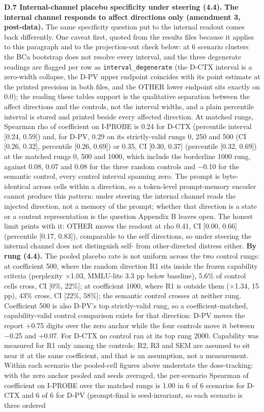 \documentclass[11pt,a4paper]{article}
\newcommand{\pnum}[2]{#2}
\begin{document}
\textbf{D.7 Internal-channel placebo specificity under steering (4.4).} \textbf{The internal channel responds to affect directions only (amendment 3, post-data).} The same specificity question put to the internal readout comes back differently. One caveat first, quoted from the results files because it applies to this paragraph and to the projection-out check below: at 6 scenario clusters the BCa bootstrap does not resolve every interval, and the three degenerate readings are flagged per row as \texttt{interval\_degenerate} (the D-CTX interval is a zero-width collapse, the D-PV upper endpoint coincides with its point estimate at the printed precision in both files, and the OTHER lower endpoint sits exactly on 0.0); the reading these tables support is the qualitative separation between the affect directions and the controls, not the interval widths, and a plain percentile interval is stored and printed beside every affected direction. At matched rungs, Spearman rho of coefficient on I-PROBE is \pnum{panelAp\_internal\_specificity}{0.24} for D-CTX (percentile interval [0.24, 0.59]) and, for D-PV, 0.29 on its strictly-valid rungs 0, 250 and 500 (CI [0.26, 0.32], percentile [0.26, 0.69]) or 0.35, CI [0.30, 0.37] (percentile [0.32, 0.69]) at the matched rungs 0, 500 and 1000, which include the borderline 1000 rung, against 0.08, 0.07 and 0.08 for the three random controls and $-$0.10 for the semantic control, every control interval spanning zero. The prompt is byte-identical across cells within a direction, so a token-level prompt-memory encoder cannot produce this pattern: under steering the internal channel reads the injected direction, not a memory of the prompt; whether that direction is a state or a content representation is the question Appendix B leaves open. The honest limit prints with it: OTHER moves the readout at rho 0.41, CI [0.00, 0.66] (percentile [0.17, 0.83]), comparable to the self directions, so under steering the internal channel does not distinguish self- from other-directed distress either. \textbf{By rung (4.4).} The pooled placebo rate is not uniform across the two control rungs: at coefficient 500, where the random direction R1 sits inside the frozen capability criteria (perplexity $\times$\pnum{panelA\_specificity\_by\_rung}{1.03}, MMLU-lite 3.3 pp below baseline), 5.6\% of control cells cross, CI [0\%, 22\%]; at coefficient 1000, where R1 is outside them ($\times$1.34, 15 pp), 43\% cross, CI [22\%, 58\%]; the semantic control crosses at neither rung. Coefficient 500 is also D-PV's top strictly-valid rung, so a coefficient-matched, capability-valid control comparison exists for that direction: D-PV moves the report $+$0.75 digits over the zero anchor while the four controls move it between $-$0.25 and $+$0.07. For D-CTX no control ran at its top rung 2000. Capability was measured for R1 only among the controls; R2, R3 and SEM are assumed to sit near it at the same coefficient, and that is an assumption, not a measurement. Within each scenario the pooled-cell figures above understate the dose-tracking: with the zero anchor pooled and seeds averaged, the per-scenario Spearman of coefficient on I-PROBE over the matched rungs is 1.00 in 6 of 6 scenarios for D-CTX and 6 of 6 for D-PV (prompt-final is seed-invariant, so each scenario is three ordered 
\end{document}
